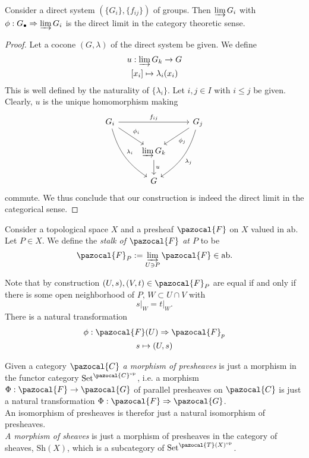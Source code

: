 \begin{lemma}
    Consider a direct system $(\{G_i\},\{f_{ij}\})$ of groups. Then $\varinjlim G_i$ with $\phi: G_\bullet \Rightarrow \varinjlim G_i$ is the direct limit in the category theoretic sense.
\end{lemma}
\begin{proof}
    Let a cocone $(G,\lambda)$ of the direct system be given. We define 
    \begin{gather*}
        u : \varinjlim G_k \rightarrow G\\
        [x_i] \mapsto \lambda_i(x_i)
    \end{gather*}
    This is well defined by the naturality of $\{\lambda_i\}$. Let $i,j\in I$ with $i\leq j$ be given. Clearly, $u$ is the unique homomorphism making 
    $$
        \begin{tikzcd}
            G_i \arrow[rr,"f_{ij}"] \arrow[rd, "\phi_i"]\arrow[rdd, "\lambda_i",bend right = 20] && G_j \arrow[ld,"\phi_j"]\arrow[ldd,"\lambda_j",bend left = 20]\\
            & \varinjlim G_k \arrow[d," u"]\\
            & G
        \end{tikzcd}
    $$    
    commute. We thus conclude that our construction is indeed the direct limit in the categorical sense. 
\end{proof}
\begin{definition}
    Consider a topological space $X$ and a presheaf $\pazocal{F}$ on $X$ valued in $\mathrm{ab}$. Let $P\in X$. We define the \emph{stalk of $\pazocal{F}$ at $P$} to be  
    $$
        \pazocal{F}_P := \varinjlim_{U\ni P} \pazocal{F}\in \mathrm{ab}. 
    $$ 
\end{definition}
\begin{remark}
    Note that by construction $(U,s),(V,t)\in \pazocal{F}_P$ are equal if and only if there is some open neighborhood of $P$,  $W\subset U\cap V$ with 
    $$\left. s\right|_{W} = \left. t\right|_W.$$
    There is a natural transformation 
    \begin{gather*}
        \phi : \pazocal{F}(U) \Rightarrow \pazocal{F}_p\\
        s\mapsto (U,s)
    \end{gather*}
\end{remark}
\begin{definition}
    Given a category $\pazocal{C}$ \emph{a morphism of presheaves} is just a morphism in the functor category $\mathrm{Set}^{\pazocal{C}\op}$, i.e. a morphism $\Phi: \pazocal{F} \rightarrow \pazocal{G}$ of parallel presheaves on $\pazocal{C}$ is just a natural transformation $\Phi : \pazocal{F}\Rightarrow \pazocal{G}$.\\
    An isomorphism of presheaves is therefor just a natural isomorphism of presheaves. \\
    \emph{A morphism of sheaves} is just a morphism of presheaves in the category of sheaves, $\mathrm{Sh}(X)$, which is a subcategory of $\mathrm{Set}^{\pazocal{T}(X)\op}$.   
\end{definition}
